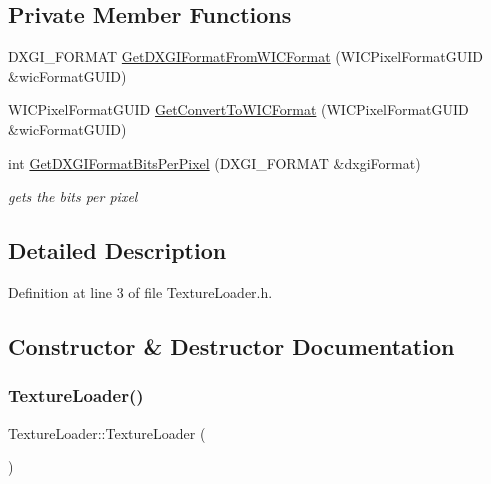\subsection*{Private Member Functions}
\begin{DoxyCompactItemize}
\item 
D\+X\+G\+I\+\_\+\+F\+O\+R\+M\+AT \mbox{\hyperlink{class_texture_loader_a326429e52878185255290f5bc1ae0219}{Get\+D\+X\+G\+I\+Format\+From\+W\+I\+C\+Format}} (W\+I\+C\+Pixel\+Format\+G\+U\+ID \&wic\+Format\+G\+U\+ID)
\item 
W\+I\+C\+Pixel\+Format\+G\+U\+ID \mbox{\hyperlink{class_texture_loader_a7a5e02ea4500b85ca7dc437f741bd90e}{Get\+Convert\+To\+W\+I\+C\+Format}} (W\+I\+C\+Pixel\+Format\+G\+U\+ID \&wic\+Format\+G\+U\+ID)
\item 
int \mbox{\hyperlink{class_texture_loader_a32ad2663545df2f57f794d617429ebd1}{Get\+D\+X\+G\+I\+Format\+Bits\+Per\+Pixel}} (D\+X\+G\+I\+\_\+\+F\+O\+R\+M\+AT \&dxgi\+Format)
\begin{DoxyCompactList}\small\item\em gets the bits per pixel \end{DoxyCompactList}\end{DoxyCompactItemize}


\subsection{Detailed Description}


Definition at line 3 of file Texture\+Loader.\+h.



\subsection{Constructor \& Destructor Documentation}
\mbox{\label{class_texture_loader_aafa6ca3bdbee3874a73aafae39d5c804}} 
\subsubsection{\texorpdfstring{Texture\+Loader()}{TextureLoader()}}
{\footnotesize\ttfamily Texture\+Loader\+::\+Texture\+Loader (\begin{DoxyParamCaption}{ }\end{DoxyParamCaption})}



